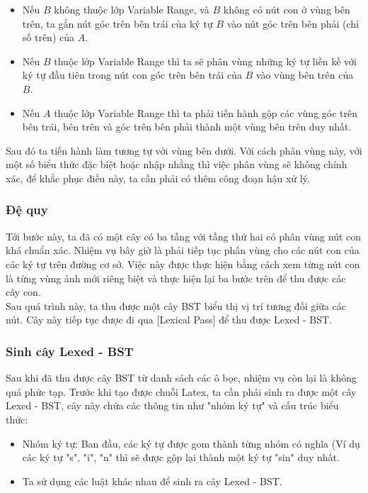 \documentclass[a4paper,12pt]{article}
\begin{document}
	\begin{itemize}
		\item Nếu $B$ không thuộc lớp Variable Range, và $B$ không có nút con ở vùng bên trên, ta gắn nút góc trên bên trái của ký tự $B$ vào nút góc trên bên phải (chỉ số trên) của $A$. 
		\item Nếu $B$ thuộc lớp Variable Range thì ta sẽ phân vùng những ký tự liền kề với ký tự đầu tiên trong nút con góc trên bên trái của $B$ vào vùng bên trên của $B$. 
		\item Nếu $A$ thuộc lớp Variable Range thì ta phải tiến hành gộp các vùng góc trên bên trái, bên trên và góc trên bên phải thành một vùng bên trên duy nhất.
	\end{itemize}
	
	Sau đó ta tiến hành làm tương tự với vùng bên dưới. Với cách phân vùng này, với một số biểu thức đặc biệt hoặc nhập nhằng thì việc phân vùng sẽ không chính xác, để khắc phục điều này, ta cần phải có thêm công đoạn hậu xử lý.\\
	
	\subsubsection*{Đệ quy}
	
	Tới bước này, ta đã có một cây có ba tầng với tầng thứ hai có phân vùng nút con khá chuẩn xác. Nhiệm vụ bây giờ là phải tiếp tục phân vùng cho các nút con của các ký tự trên đường cơ sở. Việc này được thực hiện bằng cách xem từng nút con là từng vùng ảnh mới riêng biệt và thực hiện lại ba bước trên để thu được các cây con. \\
	
	Sau quá trình này, ta thu được một cây BST biểu thị vị trí tương đối giữa các nút. Cây này tiếp tục được đi qua [Lexical Pass] để thu được Lexed - BST.
	
	\subsubsection{Sinh cây Lexed - BST}
	
	Sau khi đã thu được cây BST từ danh sách các ô bọc, nhiệm vụ còn lại là không quá phức tạp. Trước khi tạo được chuỗi Latex, ta cần phải sinh ra được một cây Lexed - BST, cây này chứa các thông tin như "nhóm ký tự" và cấu trúc biểu thức:
	
	\begin{itemize}
		\item Nhóm ký tự: Ban đầu, các ký tự được gom thành từng nhóm có nghĩa (Ví dụ các ký tự "s", "i", "n" thì sẽ được gộp lại thành một ký tự "sin" duy nhất.
		\item Ta sử dụng các luật khác nhau để sinh ra cây Lexed - BST.
	\end{itemize}
	
\end{document}

